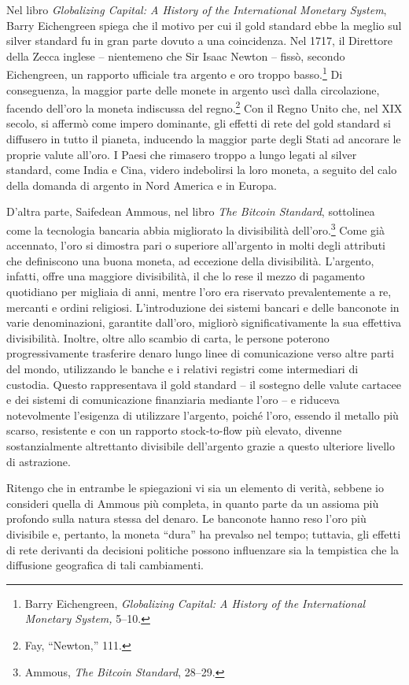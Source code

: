 \documentclass[
  a5paper,
  smalldemyvopaper,10pt,twoside,onecolumn,openright,extrafontsizes,hidelinks]{memoir}
\begin{document}
Nel libro \emph{Globalizing Capital: A History of the International
Monetary System}, Barry Eichengreen spiega che il motivo per cui il gold
standard ebbe la meglio sul silver standard fu in gran parte dovuto a
una coincidenza. Nel 1717, il Direttore della Zecca inglese --
nientemeno che Sir Isaac Newton -- fissò, secondo Eichengreen, un
rapporto ufficiale tra argento e oro troppo basso.\footnote{Barry
  Eichengreen, \emph{Globalizing Capital: A History of the International
  Monetary System,} 5--10.} Di conseguenza, la maggior parte delle
monete in argento uscì dalla circolazione, facendo dell'oro la moneta
indiscussa del regno.\footnote{Fay, ``Newton,'' 111.} Con il Regno Unito
che, nel XIX secolo, si affermò come impero dominante, gli effetti di
rete del gold standard si diffusero in tutto il pianeta, inducendo la
maggior parte degli Stati ad ancorare le proprie valute all'oro. I Paesi
che rimasero troppo a lungo legati al silver standard, come India e
Cina, videro indebolirsi la loro moneta, a seguito del calo della
domanda di argento in Nord America e in Europa.

D'altra parte, Saifedean Ammous, nel libro \emph{The Bitcoin Standard},
sottolinea come la tecnologia bancaria abbia migliorato la divisibilità
dell'oro.\footnote{Ammous, \emph{The Bitcoin Standard}, 28--29.} Come
già accennato, l'oro si dimostra pari o superiore all'argento in molti
degli attributi che definiscono una buona moneta, ad eccezione della
divisibilità. L'argento, infatti, offre una maggiore divisibilità, il
che lo rese il mezzo di pagamento quotidiano per migliaia di anni,
mentre l'oro era riservato prevalentemente a re, mercanti e ordini
religiosi. L'introduzione dei sistemi bancari e delle banconote in varie
denominazioni, garantite dall'oro, migliorò significativamente la sua
effettiva divisibilità. Inoltre, oltre allo scambio di carta, le persone
poterono progressivamente trasferire denaro lungo linee di comunicazione
verso altre parti del mondo, utilizzando le banche e i relativi registri
come intermediari di custodia. Questo rappresentava il gold standard --
il sostegno delle valute cartacee e dei sistemi di comunicazione
finanziaria mediante l'oro -- e riduceva notevolmente l'esigenza di
utilizzare l'argento, poiché l'oro, essendo il metallo più scarso,
resistente e con un rapporto stock-to-flow più elevato, divenne
sostanzialmente altrettanto divisibile dell'argento grazie a questo
ulteriore livello di astrazione.

Ritengo che in entrambe le spiegazioni vi sia un elemento di verità,
sebbene io consideri quella di Ammous più completa, in quanto parte da
un assioma più profondo sulla natura stessa del denaro. Le banconote
hanno reso l'oro più divisibile e, pertanto, la moneta ``dura'' ha
prevalso nel tempo; tuttavia, gli effetti di rete derivanti da decisioni
politiche possono influenzare sia la tempistica che la diffusione
geografica di tali cambiamenti.
\end{document}

